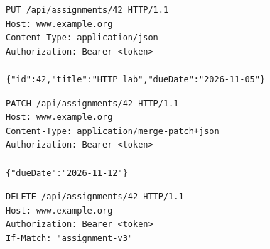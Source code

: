 \begin{affianco}[0.55][c]
\begin{lstlisting}[style=http, name=PUT]
PUT /api/assignments/42 HTTP/1.1
Host: www.example.org
Content-Type: application/json
Authorization: Bearer <token>

{"id":42,"title":"HTTP lab","dueDate":"2026-11-05"}
\end{lstlisting}
\risultato
{}
\end{affianco}

\begin{affianco}[0.55][c]
\begin{lstlisting}[style=http, name=PATCH]
PATCH /api/assignments/42 HTTP/1.1
Host: www.example.org
Content-Type: application/merge-patch+json
Authorization: Bearer <token>

{"dueDate":"2026-11-12"}
\end{lstlisting}
\risultato
{}
\end{affianco}

\begin{affianco}[0.55][c]
\begin{lstlisting}[style=http, name=DELETE]
DELETE /api/assignments/42 HTTP/1.1
Host: www.example.org
Authorization: Bearer <token>
If-Match: "assignment-v3"
\end{lstlisting}
\risultato
{}
\end{affianco}

